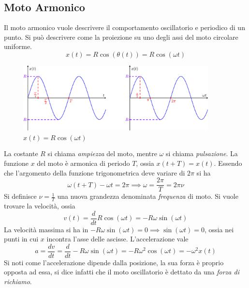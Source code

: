 \documentclass[10pt, letterpaper]{report}
\begin{document}
\subsection{Moto Armonico}
Il moto armonico vuole descrivere il comportamento oscillatorio e periodico di un punto. Si può 
descrivere come la proiezione su uno degli assi del moto circolare uniforme. 
$$ x(t)=R\cos(\theta(t))=R\cos(\omega t)$$
\begin{center}\begin{figure}[h!]
    \centering
    \includegraphics[width=0.9\textwidth]{images/armonica.eps}
    \caption{$x(t)=R\cos(\omega t)$}
    \label{cerchioOsculante}
\end{figure} \end{center}
La costante $R$ si chiama \textit{ampiezza} del moto, mentre $\omega$ si chiama \textit{pulsazione}.
La funzione $x$ del moto è armonica di periodo $T$, ossia $x(t+T)=x(t)$. Essendo che l'argomento della  funzione  
trigonometrica deve variare di $2\pi$ si ha 
$$\omega(t+T)-\omega t = 2\pi \implies \omega = \frac{2\pi}{T}=2\pi\nu$$
Si definisce $\nu=\frac{1}{T}$ una nuova grandezza denominata \textit{frequenza} di moto.
\acc Si vuole trovare la velocità, ossia 
$$ v(t)=\frac{d}{dt}R\cos(\omega t)=-R\omega\sin(\omega t)$$
La velocità massima si ha in $-R\omega\sin(\omega t)=0\implies \sin(\omega t)=0$, ossia nei punti 
in cui $x$ incontra l'asse delle ascisse. L'accelerazione vale 
$$ a=\frac{dv}{dt}=\frac{d}{dt}-R\omega\sin(\omega t)=-R\omega^2\cos(\omega t)=-\omega^2x(t)$$
Si noti come l'accelerazione dipende dalla posizione, la sua forza è proprio opposta ad essa, 
si dice infatti che il moto oscillatorio è dettato da una \textit{forza di richiamo}.
\flowerLine
\end{document}

